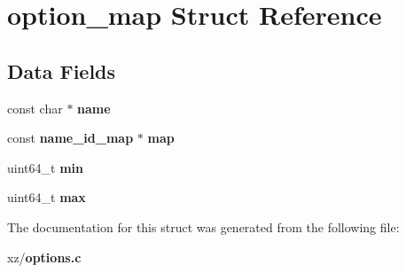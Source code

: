 \section{option\-\_\-map Struct Reference}
\label{structoption__map}
\subsection*{Data Fields}
\begin{DoxyCompactItemize}
\item 
const char $\ast$ {\bfseries name}\label{structoption__map_ad35da6b28ae48a69f7dd76ea7971b869}

\item 
const {\bf name\-\_\-id\-\_\-map} $\ast$ {\bfseries map}\label{structoption__map_ae591a7f07dfec117adc89e7e6d7393ad}

\item 
uint64\-\_\-t {\bfseries min}\label{structoption__map_a178e75dba6d1afbe9edd86c89cfa2a58}

\item 
uint64\-\_\-t {\bfseries max}\label{structoption__map_a8a94842dae4a51597fd13fdfcc0c660c}

\end{DoxyCompactItemize}


The documentation for this struct was generated from the following file\-:\begin{DoxyCompactItemize}
\item 
xz/{\bf options.\-c}\end{DoxyCompactItemize}
